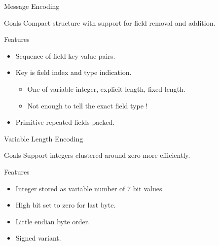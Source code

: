\begin{frame}{Message Encoding}
    \begin{block}{Goals}
        Compact structure with support for field removal and addition.
    \end{block}

    \bigskip

    \begin{block}{Features}
        \begin{itemize}
            \item Sequence of field key value pairs.
            \item Key is field index and type indication.
                \begin{itemize}
                    \item One of variable integer, explicit length, fixed length.
                    \item Not enough to tell the exact field type !
                \end{itemize}
            \item Primitive repeated fields packed.
        \end{itemize}
    \end{block}
\end{frame}


\begin{frame}{Variable Length Encoding}
    \begin{block}{Goals}
        Support integers clustered around zero more efficiently.
    \end{block}

    \bigskip

    \begin{block}{Features}
        \begin{itemize}
            \item Integer stored as variable number of 7 bit values.
            \item High bit set to zero for last byte.
            \item Little endian byte order.
            \item Signed variant.
        \end{itemize}
    \end{block}
\end{frame}



